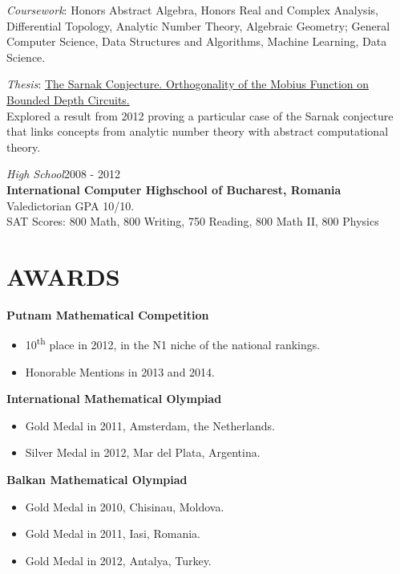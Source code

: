\documentclass[margin]{res}
\begin{document}
\begin{resume}
  {\sl Coursework\/}:  Honors Abstract Algebra, Honors Real and Complex Analysis, Differential Topology,
    Analytic Number Theory, Algebraic Geometry; General Computer Science, Data Structures and
    Algorithms, Machine Learning, Data Science.
  \vspace{-6pt}

  {\sl Thesis\/}: \href{http://math.harvard.edu/theses/senior/dragoi/dragoi.pdf}
  {The Sarnak Conjecture. Orthogonality of the Mobius Function on Bounded Depth Circuits.} \\
  Explored a result from 2012 proving a particular case of the Sarnak conjecture that links
  concepts from analytic number theory with abstract computational theory.
  \vspace{-6pt}

  {\sl High School}\hfill 2008 - 2012 \\
  \textbf{International Computer Highschool of Bucharest, Romania}\\
  Valedictorian GPA 10/10.\\
  SAT Scores: 800 Math, 800 Writing, 750 Reading, 800 Math II, 800 Physics
  \vspace{8pt}

  \section{AWARDS} \textbf{Putnam Mathematical Competition}
  \begin{itemize} \itemsep -2pt
    \item 10\textsuperscript{th} place in 2012, in the N1 niche of the national rankings.
    \item Honorable Mentions in 2013 and 2014.
  \end{itemize}
  \textbf{International Mathematical Olympiad}
  \begin{itemize} \itemsep -1pt
    \item Gold Medal in 2011, Amsterdam, the Netherlands.
    \item Silver Medal in 2012, Mar del Plata, Argentina.
  \end{itemize}
  \textbf{Balkan Mathematical Olympiad}
  \begin{itemize} \itemsep -1pt
    \item Gold Medal in 2010, Chisinau, Moldova.
    \item Gold Medal in 2011, Iasi, Romania.
    \item Gold Medal in 2012, Antalya, Turkey.
  \end{itemize}
  \newpage


\end{resume}
\end{document}
